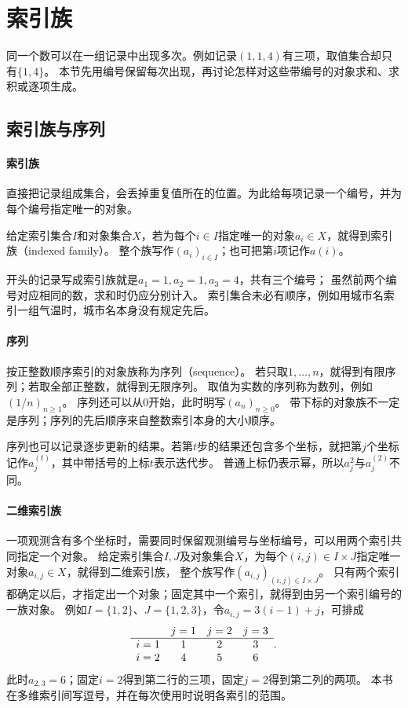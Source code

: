 \section{索引族}
\label{sec:prelim-indices-sums-recurrences}

同一个数可以在一组记录中出现多次。例如记录$(1,1,4)$有三项，取值集合却只有$\{1,4\}$。
本节先用编号保留每次出现，再讨论怎样对这些带编号的对象求和、求积或逐项生成。

\subsection{索引族与序列}
\label{sec:prelim-indexed-sequences}

\paragraph{索引族}
直接把记录组成集合，会丢掉重复值所在的位置。为此给每项记录一个编号，并为每个编号指定唯一的对象。

\begin{definition}[索引族]
\label{def:prelim-indexed-family}
给定索引集合$I$和对象集合$X$，若为每个$i\in I$指定唯一的对象$a_i\in X$，就得到索引族（indexed family）。
整个族写作$(a_i)_{i\in I}$；也可把第$i$项记作$a(i)$。
\end{definition}
开头的记录写成索引族就是$a_1=1,a_2=1,a_3=4$，共有三个编号；
虽然前两个编号对应相同的数，求和时仍应分别计入。
索引集合未必有顺序，例如用城市名索引一组气温时，城市名本身没有规定先后。

\paragraph{序列}
按正整数顺序索引的对象族称为序列（sequence）。
若只取$1,\ldots,n$，就得到有限序列；若取全部正整数，就得到无限序列。
取值为实数的序列称为数列，例如$(1/n)_{n\geq1}$。
序列还可以从$0$开始，此时明写$(a_n)_{n\geq0}$。
带下标的对象族不一定是序列；序列的先后顺序来自整数索引本身的大小顺序。

序列也可以记录逐步更新的结果。若第$t$步的结果还包含多个坐标，就把第$j$个坐标记作$a_j^{(t)}$，其中带括号的上标$t$表示迭代步。
普通上标仍表示幂，所以$a_j^2$与$a_j^{(2)}$不同。

\paragraph{二维索引族}
一项观测含有多个坐标时，需要同时保留观测编号与坐标编号，可以用两个索引共同指定一个对象。
给定索引集合$I,J$及对象集合$X$，为每个$(i,j)\in I\times J$指定唯一对象$a_{i,j}\in X$，就得到二维索引族，
整个族写作$(a_{i,j})_{(i,j)\in I\times J}$。
只有两个索引都确定以后，才指定出一个对象；固定其中一个索引，就得到由另一个索引编号的一族对象。
例如$I=\{1,2\}$、$J=\{1,2,3\}$，令$a_{i,j}=3(i-1)+j$，可排成
\[
 \begin{array}{c@{\quad}ccc}
  &j=1&j=2&j=3\\\hline
 i=1&1&2&3\\
 i=2&4&5&6
 \end{array}.
\]
此时$a_{2,3}=6$；固定$i=2$得到第二行的三项，固定$j=2$得到第二列的两项。
本书在多维索引间写逗号，并在每次使用时说明各索引的范围。

